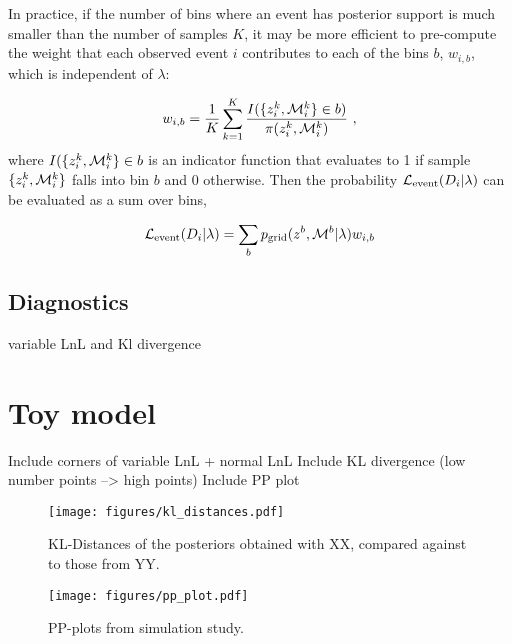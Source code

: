 \documentclass[twocolumn]{aastex631}
\begin{document}
In practice, if the number of bins where an event has posterior support is much smaller than the number of samples $K$, it may be more efficient to pre-compute the weight that each observed event $i$ contributes to each of the bins $b$, $w_{i,b}$, which is independent of $\lambda$:

\begin{equation}
    w_{i,b} = \frac{1}{K} \sum^K_{k=1} \frac{I(\{z^k_i,\Mc^k_i\} \in b)}{\pi(z_i^k,\Mc_i^k)} \ ,
\end{equation}
where $I(\{z^k_i,\mathcal{M}^k_i\} \in b$ is an indicator function that evaluates to 1 if sample $\{z^k_i,\mathcal{M}^k_i\}$ falls into bin $b$ and $0$ otherwise.
Then the probability $\mathcal{L}_{\rm event}(D_i|\lambda)$ can be evaluated as a sum over bins,

\begin{equation}
    \Le(D_i|\lambda) = \sum_b \pg(z^b, \Mc^b | \lambda) w_{i,b}
\end{equation}


\subsection{Diagnostics}
variable LnL and Kl divergence

\section{Toy model}
Include corners of variable LnL + normal LnL
Include KL divergence (low number points --> high points)
Include PP plot




\begin{figure}[ht!]
    \begin{centering}
        \texttt{[image: figures/kl\_distances.pdf]}
        \caption{
            KL-Distances of the posteriors obtained with XX, compared against to those from YY.
        }
        \label{fig:kl_distances}
    \end{centering}
\end{figure}


\begin{figure}[ht!]
    \begin{centering}
        \texttt{[image: figures/pp\_plot.pdf]}
        \caption{
            PP-plots from simulation study.
        }
        \label{fig:pp_plot}
    \end{centering}
\end{figure}
\end{document}
